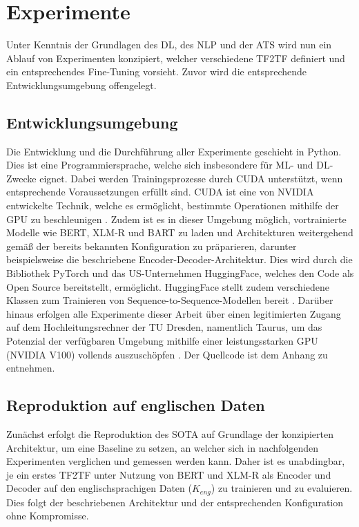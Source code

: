 \chapter{Experimente}
\thispagestyle{fancy}
\label{chap:Experimente}

\noindent
Unter Kenntnis der Grundlagen des \ac{DL}, des \ac{NLP} und der \ac{ATS} wird nun ein Ablauf von Experimenten konzipiert, welcher verschiedene \ac{TF2TF} definiert und ein entsprechendes Fine-Tuning vorsieht. Zuvor wird die entsprechende Entwicklungsumgebung offengelegt.


\section{Entwicklungsumgebung}
\noindent
Die Entwicklung und die Durchführung aller Experimente geschieht in Python. Dies ist eine Programmiersprache, welche sich insbesondere für \ac{ML}- und \ac{DL}-Zwecke eignet. Dabei werden Trainingsprozesse durch \ac{CUDA} unterstützt, wenn entsprechende Voraussetzungen erfüllt sind. \ac{CUDA} ist eine von NVIDIA entwickelte Technik, welche es ermöglicht, bestimmte Operationen mithilfe der GPU zu beschleunigen \cite{NVI21}. Zudem ist es in dieser Umgebung möglich, vortrainierte Modelle wie \ac{BERT}, {XLM-R} und \ac{BART} zu laden und Architekturen weitergehend gemäß der bereits bekannten Konfiguration zu präparieren, darunter beispielsweise die beschriebene Encoder-Decoder-Architektur. Dies wird durch die Bibliothek PyTorch und das US-Unternehmen HuggingFace, welches den Code als Open Source bereitstellt, ermöglicht. HuggingFace stellt zudem verschiedene Klassen zum Trainieren von Sequence-to-Sequence-Modellen bereit \cite{HUG21}. Darüber hinaus erfolgen alle Experimente dieser Arbeit über einen legitimierten Zugang auf dem Hochleitungsrechner der TU Dresden, namentlich Taurus, um das Potenzial der verfügbaren Umgebung mithilfe einer leistungsstarken GPU (NVIDIA V100) vollends auszuschöpfen \cite{ZIH21}. Der Quellcode ist dem Anhang zu entnehmen.
\newpage


\section{Reproduktion auf englischen Daten}
\noindent
Zunächst erfolgt die Reproduktion des \ac{SOTA} auf Grundlage der konzipierten Architektur, um eine Baseline zu setzen, an welcher sich in nachfolgenden Experimenten verglichen und gemessen werden kann. Daher ist es unabdingbar, je ein erstes \ac{TF2TF} unter Nutzung von \ac{BERT} und {XLM-R} als Encoder und Decoder auf den englischsprachigen Daten ($K_{eng}$) zu trainieren und zu evaluieren. Dies folgt der beschriebenen Architektur und der entsprechenden Konfiguration ohne Kompromisse.


